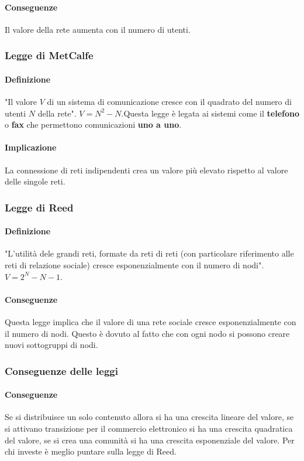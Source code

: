             \paragraph{Conseguenze} Il valore della rete aumenta con il numero di utenti.
        \subsubsection{Legge di MetCalfe}
            \paragraph{Definizione} "Il valore $ V $ di un sistema di comunicazione cresce con il quadrato del numero di utenti $ N $ della rete". $ V = N^2 - N $.\newline Questa legge è legata ai sistemi come il \textbf{telefono} o \textbf{fax} che permettono comunicazioni \textbf{uno a uno}.
            \paragraph{Implicazione} La connessione di reti indipendenti crea un valore più elevato rispetto al valore delle singole reti.
        \subsubsection{Legge di Reed}
            \paragraph{Definizione} "L'utilità dele grandi reti, formate da reti di reti (con particolare riferimento alle reti di relazione sociale) cresce esponenzialmente con il numero di nodi". $ V = 2^N - N - 1 $.
            \paragraph{Conseguenze} Questa legge implica che il valore di una rete sociale cresce esponenzialmente con il numero di nodi. Questo è dovuto al fatto che con ogni nodo si possono creare nuovi sottogruppi di nodi.
        \subsubsection{Conseguenze delle leggi}
            \paragraph{Conseguenze} Se si distribuisce un solo contenuto allora si ha una crescita lineare del valore, se si attivano transizione per il commercio elettronico si ha una crescita quadratica del valore, se si crea una comunità si ha una crescita esponenziale del valore. \newline Per chi investe è meglio puntare sulla legge di Reed.
